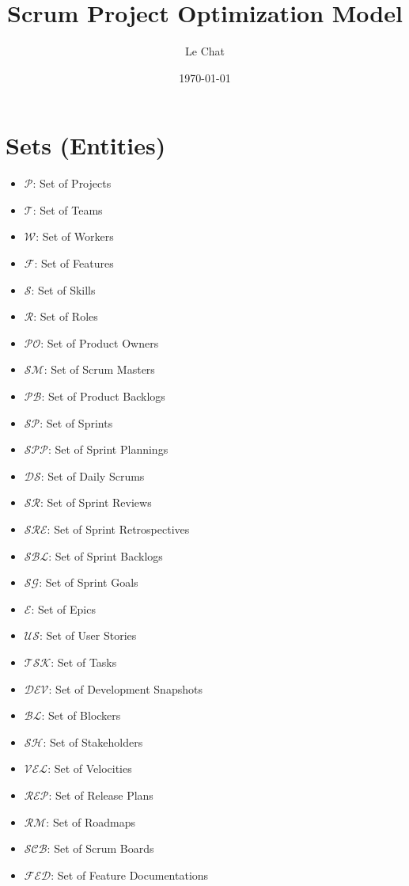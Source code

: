 \documentclass{article}
\title{Scrum Project Optimization Model}
\author{Le Chat}
\date{\today}
\begin{document}
\maketitle
\tableofcontents

\section{Sets (Entities)}
\begin{itemize}
    \item $\mathcal{P}$: Set of Projects
    \item $\mathcal{T}$: Set of Teams
    \item $\mathcal{W}$: Set of Workers
    \item $\mathcal{F}$: Set of Features
    \item $\mathcal{S}$: Set of Skills
    \item $\mathcal{R}$: Set of Roles
    \item $\mathcal{PO}$: Set of Product Owners
    \item $\mathcal{SM}$: Set of Scrum Masters
    \item $\mathcal{PB}$: Set of Product Backlogs
    \item $\mathcal{SP}$: Set of Sprints
    \item $\mathcal{SPP}$: Set of Sprint Plannings
    \item $\mathcal{DS}$: Set of Daily Scrums
    \item $\mathcal{SR}$: Set of Sprint Reviews
    \item $\mathcal{SRE}$: Set of Sprint Retrospectives
    \item $\mathcal{SBL}$: Set of Sprint Backlogs
    \item $\mathcal{SG}$: Set of Sprint Goals
    \item $\mathcal{E}$: Set of Epics
    \item $\mathcal{US}$: Set of User Stories
    \item $\mathcal{TSK}$: Set of Tasks
    \item $\mathcal{DEV}$: Set of Development Snapshots
    \item $\mathcal{BL}$: Set of Blockers
    \item $\mathcal{SH}$: Set of Stakeholders
    \item $\mathcal{VEL}$: Set of Velocities
    \item $\mathcal{REP}$: Set of Release Plans
    \item $\mathcal{RM}$: Set of Roadmaps
    \item $\mathcal{SCB}$: Set of Scrum Boards
    \item $\mathcal{FED}$: Set of Feature Documentations
\end{itemize}
\end{document}
